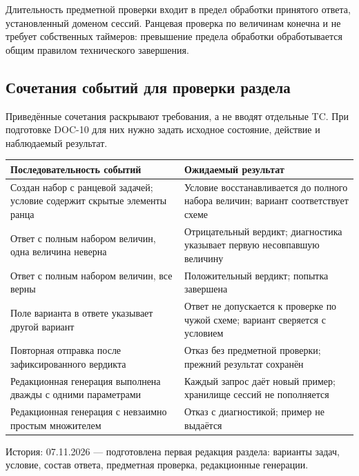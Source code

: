 \documentclass[12pt,a4paper]{article}
\begin{document}
Длительность предметной проверки входит в предел обработки принятого ответа, установленный доменом сессий. Ранцевая проверка по величинам конечна и не требует собственных таймеров: превышение предела обработки обработывается общим правилом технического завершения.

\subsection{Сочетания событий для проверки раздела}\label{ux441ux43eux447ux435ux442ux430ux43dux438ux44f-ux441ux43eux431ux44bux442ux438ux439-ux434ux43bux44f-ux43fux440ux43eux432ux435ux440ux43aux438-ux440ux430ux437ux434ux435ux43bux430}

\hypertarget{сочетания-событий-для-проверки-раздела}{}

Приведённые сочетания раскрывают требования, а не вводят отдельные TC. При подготовке DOC-10 для них нужно задать исходное состояние, действие и наблюдаемый результат.

{\def\LTcaptype{none} %
\begin{longtable}[]{@{}
  >{\raggedright\arraybackslash}p{}
  >{\raggedright\arraybackslash}p{}@{}}
\toprule\noalign{}
\begin{minipage}[b]{\linewidth}\raggedright
Последовательность событий
\end{minipage} & \begin{minipage}[b]{\linewidth}\raggedright
Ожидаемый результат
\end{minipage} \\
\midrule\noalign{}
\endhead
\bottomrule\noalign{}
\endlastfoot
Создан набор с ранцевой задачей; условие содержит скрытые элементы ранца & Условие восстанавливается до полного набора величин; вариант соответствует схеме \\
Ответ с полным набором величин, одна величина неверна & Отрицательный вердикт; диагностика указывает первую несовпавшую величину \\
Ответ с полным набором величин, все верны & Положительный вердикт; попытка завершена \\
Поле варианта в ответе указывает другой вариант & Ответ не допускается к проверке по чужой схеме; вариант сверяется с условием \\
Повторная отправка после зафиксированного вердикта & Отказ без предметной проверки; прежний результат сохранён \\
Редакционная генерация выполнена дважды с одними параметрами & Каждый запрос даёт новый пример; хранилище сессий не пополняется \\
Редакционная генерация с невзаимно простым множителем & Отказ с диагностикой; пример не выдаётся \\
\end{longtable}
}

История: 07.11.2026 --- подготовлена первая редакция раздела: варианты задач, условие, состав ответа, предметная проверка, редакционные генерации.
\end{document}
